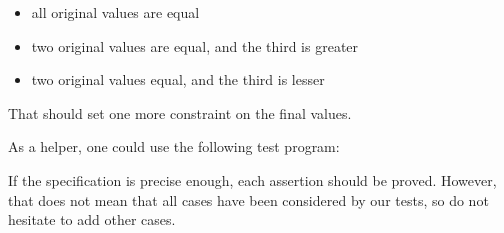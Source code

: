 \begin{itemize}
\item all original values are equal
\item two original values are equal, and the third is greater
\item two original values equal, and the third is lesser
\end{itemize}


That should set one more constraint on the final values.


As a helper, one could use the following test program:




If the specification is precise enough, each assertion should be proved.
However, that does not mean that all cases have been considered by our tests,
so do not hesitate to add other cases.


